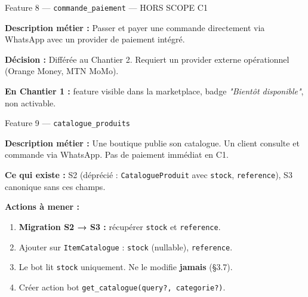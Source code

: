 \documentclass[11pt,a4paper]{article}
\newcommand{\slug}[1]{\texttt{\color{AGTDark}#1}}
\newcommand{\priom}[1]{\textcolor{AGTOrange}{\textbf{#1}}}
\begin{document}
\bigskip

\begin{featurebox}{Feature 8 — \slug{commande\_paiement} \textcolor{AGTRed}{— HORS SCOPE C1}}

\textbf{Description métier :} Passer et payer une commande directement via
WhatsApp avec un provider de paiement intégré.

\textbf{Décision :} Différée au Chantier 2. Requiert un provider externe
opérationnel (Orange Money, MTN MoMo).

\textbf{En Chantier 1 :} feature visible dans la marketplace, badge
\textit{"Bientôt disponible"}, non activable.

\end{featurebox}

\bigskip

\begin{featurebox}{Feature 9 — \slug{catalogue\_produits}}

\textbf{Description métier :} Une boutique publie son catalogue. Un client
consulte et commande via WhatsApp. Pas de paiement immédiat en C1.

\textbf{Ce qui existe :} S2 (déprécié : \slug{CatalogueProduit} avec \slug{stock},
\slug{reference}), S3 canonique sans ces champs.

\medskip
\textbf{Actions à mener :}
\begin{enumerate}
  \item \priom{Migration S2 → S3 :} récupérer \slug{stock} et \slug{reference}.
  \item Ajouter sur \slug{ItemCatalogue} : \slug{stock} (nullable), \slug{reference}.
  \item Le bot lit \slug{stock} uniquement. Ne le modifie \textbf{jamais} (§3.7).
  \item Créer action bot \slug{get\_catalogue(query?, categorie?)}.
\end{enumerate}

\end{featurebox}

\bigskip
\end{document}
